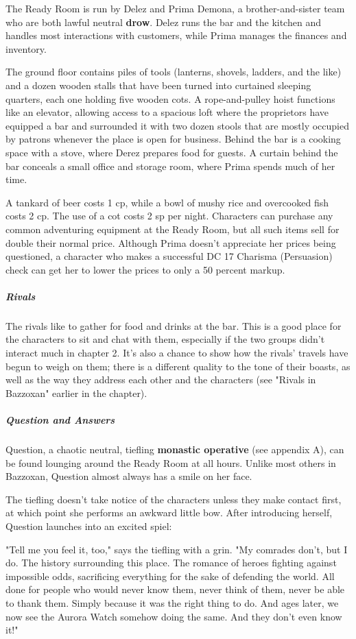 \documentclass[10pt,a4paper,twoside,bg=print,twocolumn,openany,nodeprecatedcode]{dndbook}
\begin{document}
The Ready Room is run by Delez and Prima Demona, a brother-and-sister team who are both lawful neutral \textbf{drow}. Delez runs the bar and the kitchen and handles most interactions with customers, while Prima manages the finances and inventory.

The ground floor contains piles of tools (lanterns, shovels, ladders, and the like) and a dozen wooden stalls that have been turned into curtained sleeping quarters, each one holding five wooden cots. A rope-and-pulley hoist functions like an elevator, allowing access to a spacious loft where the proprietors have equipped a bar and surrounded it with two dozen stools that are mostly occupied by patrons whenever the place is open for business. Behind the bar is a cooking space with a stove, where Derez prepares food for guests. A curtain behind the bar conceals a small office and storage room, where Prima spends much of her time.

A tankard of beer costs 1 cp, while a bowl of mushy rice and overcooked fish costs 2 cp. The use of a cot costs 2 sp per night. Characters can purchase any common adventuring equipment at the Ready Room, but all such items sell for double their normal price. Although Prima doesn't appreciate her prices being questioned, a character who makes a successful DC 17 Charisma (Persuasion) check can get her to lower the prices to only a 50 percent markup.

\subparagraph{Rivals}
The rivals like to gather for food and drinks at the bar. This is a good place for the characters to sit and chat with them, especially if the two groups didn't interact much in chapter 2. It's also a chance to show how the rivals' travels have begun to weigh on them; there is a different quality to the tone of their boasts, as well as the way they address each other and the characters (see "Rivals in Bazzoxan" earlier in the chapter).

\subparagraph{Question and Answers}
Question, a chaotic neutral, tiefling \textbf{monastic operative} (see appendix A), can be found lounging around the Ready Room at all hours. Unlike most others in Bazzoxan, Question almost always has a smile on her face.

The tiefling doesn't take notice of the characters unless they make contact first, at which point she performs an awkward little bow. After introducing herself, Question launches into an excited spiel:

\begin{DndReadAloud}{}
"Tell me you feel it, too," says the tiefling with a grin. "My comrades don't, but I do. The history surrounding this place. The romance of heroes fighting against impossible odds, sacrificing everything for the sake of defending the world. All done for people who would never know them, never think of them, never be able to thank them. Simply because it was the right thing to do. And ages later, we now see the Aurora Watch somehow doing the same. And they don't even know it!"

\end{DndReadAloud}
\end{document}
